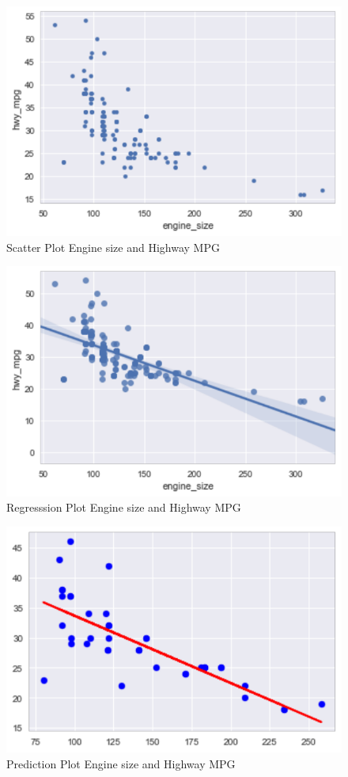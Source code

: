 \begin{figure}[htb]
  \includegraphics[scale=1.0]{images/scatterplot.pdf}
  \caption{Scatter Plot Engine size and Highway MPG}
\label{fig:scatterplt}
\end{figure}

\begin{figure}[htb]
  \includegraphics[scale=1.0]{images/reg_plot.pdf}
  \caption{Regresssion Plot Engine size and Highway MPG}
\label{fig:regplt}
\end{figure}

\begin{figure}[htb]
  \includegraphics[scale=1.0]{images/plot_pred_test_set.pdf}
  \caption{Prediction Plot Engine size and Highway MPG}
  \label{fig:predplt}
\end{figure}


 
